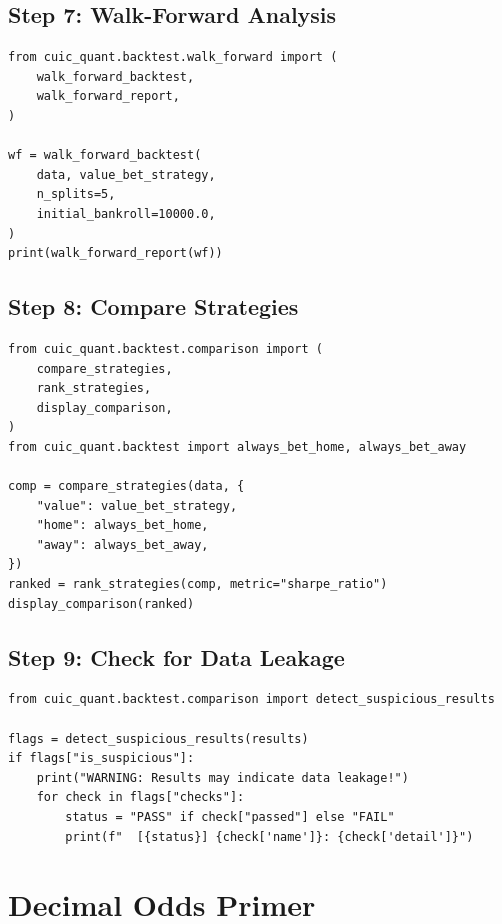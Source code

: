 \documentclass[12pt,a4paper]{report}
\theoremstyle{definition}
\begin{document}
\section{Step 7: Walk-Forward Analysis}

\begin{lstlisting}[caption={Running walk-forward analysis.}]
from cuic_quant.backtest.walk_forward import (
    walk_forward_backtest,
    walk_forward_report,
)

wf = walk_forward_backtest(
    data, value_bet_strategy,
    n_splits=5,
    initial_bankroll=10000.0,
)
print(walk_forward_report(wf))
\end{lstlisting}

\section{Step 8: Compare Strategies}

\begin{lstlisting}[caption={Comparing multiple strategies.}]
from cuic_quant.backtest.comparison import (
    compare_strategies,
    rank_strategies,
    display_comparison,
)
from cuic_quant.backtest import always_bet_home, always_bet_away

comp = compare_strategies(data, {
    "value": value_bet_strategy,
    "home": always_bet_home,
    "away": always_bet_away,
})
ranked = rank_strategies(comp, metric="sharpe_ratio")
display_comparison(ranked)
\end{lstlisting}

\section{Step 9: Check for Data Leakage}

\begin{lstlisting}[caption={Statistical anomaly detection.}]
from cuic_quant.backtest.comparison import detect_suspicious_results

flags = detect_suspicious_results(results)
if flags["is_suspicious"]:
    print("WARNING: Results may indicate data leakage!")
    for check in flags["checks"]:
        status = "PASS" if check["passed"] else "FAIL"
        print(f"  [{status}] {check['name']}: {check['detail']}")
\end{lstlisting}


\chapter{Decimal Odds Primer}
\label{ch:odds}
\end{document}
